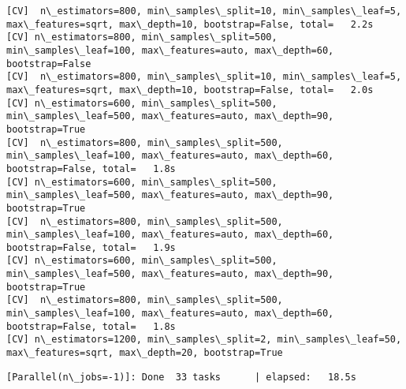 \documentclass[11pt]{article}
\begin{document}
\begin{Verbatim}[commandchars=\\\{\}]
[CV]  n\_estimators=800, min\_samples\_split=10, min\_samples\_leaf=5, max\_features=sqrt, max\_depth=10, bootstrap=False, total=   2.2s
[CV] n\_estimators=800, min\_samples\_split=500, min\_samples\_leaf=100, max\_features=auto, max\_depth=60, bootstrap=False 
[CV]  n\_estimators=800, min\_samples\_split=10, min\_samples\_leaf=5, max\_features=sqrt, max\_depth=10, bootstrap=False, total=   2.0s
[CV] n\_estimators=600, min\_samples\_split=500, min\_samples\_leaf=500, max\_features=auto, max\_depth=90, bootstrap=True 
[CV]  n\_estimators=800, min\_samples\_split=500, min\_samples\_leaf=100, max\_features=auto, max\_depth=60, bootstrap=False, total=   1.8s
[CV] n\_estimators=600, min\_samples\_split=500, min\_samples\_leaf=500, max\_features=auto, max\_depth=90, bootstrap=True 
[CV]  n\_estimators=800, min\_samples\_split=500, min\_samples\_leaf=100, max\_features=auto, max\_depth=60, bootstrap=False, total=   1.9s
[CV] n\_estimators=600, min\_samples\_split=500, min\_samples\_leaf=500, max\_features=auto, max\_depth=90, bootstrap=True 
[CV]  n\_estimators=800, min\_samples\_split=500, min\_samples\_leaf=100, max\_features=auto, max\_depth=60, bootstrap=False, total=   1.8s
[CV] n\_estimators=1200, min\_samples\_split=2, min\_samples\_leaf=50, max\_features=sqrt, max\_depth=20, bootstrap=True 

    \end{Verbatim}

    \begin{Verbatim}[commandchars=\\\{\}]
[Parallel(n\_jobs=-1)]: Done  33 tasks      | elapsed:   18.5s

    \end{Verbatim}
\end{document}
